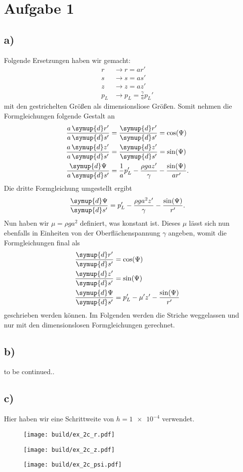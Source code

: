 \section*{Aufgabe 1}
\subsection*{a)}
Folgende Ersetzungen haben wir gemacht:
\begin{align*}
    r   & \to r     = a r' \\
    s   & \to s     = a s' \\
    z   & \to z     = a z' \\
    p_L & \to p_L = \frac{\gamma}{a} p_L'
\end{align*}
mit den gestrichelten Größen als dimensionsliose Größen.
Somit nehmen die Formgleichungen folgende Gestalt an
\begin{align*}
    \frac{a\, \symup{d}r'}{a \, \symup{d}s'} &= \frac{\symup{d}r' }{\symup{d}s'} = \cos(\Psi)  \\
    \frac{a\, \symup{d}z'}{a \, \symup{d}s'} &= \frac{\symup{d}z'}{\symup{d}s'} = \sin(\Psi) \\
    \frac{\symup{d}\Psi}{ a \, \symup{d}s'} &=  \frac{1}{a} p_L' - \frac{\rho g a z'}{\gamma} - \frac{\sin(\Psi)}{a r'}.
\end{align*}
Die dritte Formgleichung umgestellt ergibt 
\begin{equation*}
    \frac{\symup{d}\Psi}{\symup{d}s'} = p_L' - \frac{\rho g a^2 z'}{\gamma} - \frac{\sin(\Psi)}{r'} .
\end{equation*}
Nun haben wir $\mu = \rho g a^2$ definiert, was konstant ist. 
Dieses $\mu$ lässt sich nun ebenfalls in Einheiten von der Oberflächenspannung $\gamma$ angeben,
womit die Formgleichungen final als 
\begin{align*}
    \frac{\symup{d}r'}{\symup{d}s'} &= \cos(\Psi)   \\
    \frac{\symup{d}z'}{\symup{d}s'} &= \sin(\Psi)   \\
    \frac{\symup{d}\Psi}{\symup{d}s'} &=  p_L' - \mu' z' - \frac{\sin(\Psi)}{r'}
\end{align*}
geschrieben werden können.
Im Folgenden werden die Striche weggelassen und nur mit den dimensionslosen 
Formgleichungen gerechnet.
\subsection*{b)}
to be continued..
\FloatBarrier
\subsection*{c)}
Hier haben wir eine Schrittweite von $h=\num{1e-4}$ verwendet.
\begin{figure}
    \centering
    \texttt{[image: build/ex\_2c\_r.pdf]}
\end{figure}
\begin{figure}
    \centering
    \texttt{[image: build/ex\_2c\_z.pdf]}
\end{figure}
\begin{figure}
    \centering
    \texttt{[image: build/ex\_2c\_psi.pdf]}
\end{figure}